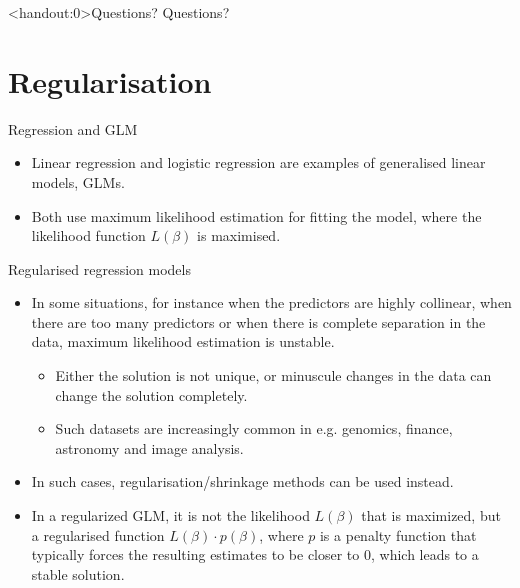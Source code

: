 \documentclass[10pt,handout]{beamer}
\begin{document}
\begin{frame}<handout:0>{Questions?}
Questions?
\end{frame}


\section{Regularisation}
\frame{\sectionpage}

\begin{frame}{Regression and GLM}
\begin{itemize}
\item Linear regression and logistic regression are examples of {\color{uured}generalised linear models}, GLMs.\\[3mm]\pause
\item Both use maximum likelihood estimation for fitting the model, where the likelihood function $L(\beta)$ is maximised.
\end{itemize}
\end{frame}

\begin{frame}{Regularised regression models}
\begin{itemize}
\item In some situations, for instance when the predictors are highly collinear, when there are too many predictors or when there is complete separation in the data, maximum likelihood estimation is unstable.\pause
\begin{itemize}
\item Either the solution is not unique, or minuscule changes in the data can change the solution completely.\pause
\item Such datasets are increasingly common in e.g. genomics, finance, astronomy and image analysis.\\[3mm]\pause
\end{itemize}

\item In such cases, {\color{uured}regularisation/shrinkage methods} can be used instead.\\[3mm]\pause
\item In a regularized GLM, it is not the likelihood $L(\beta)$ that is maximized, but a {\color{uured}regularised} function $L(\beta) \cdot p(\beta)$, where $p$ is a penalty function that typically forces the resulting estimates to be closer to 0, which leads to a stable solution.
\end{itemize}
\end{frame}
\end{document}
